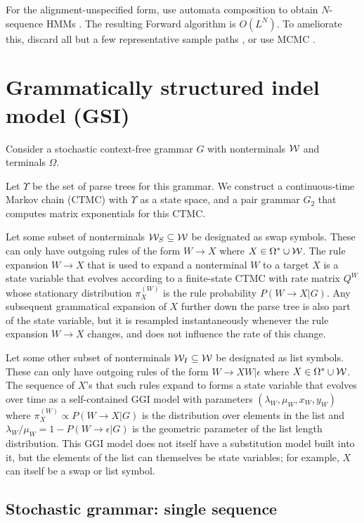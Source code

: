 \documentclass{article}
\begin{document}
For the alignment-unspecified form, use automata composition to obtain $N$-sequence HMMs \cite{SilvestreRyanEtAl2020}.
The resulting Forward algorithm is $O(L^N)$.
To ameliorate this, discard all but a few representative sample paths \cite{WestessonEtAl2012},
or use MCMC \cite{RedelingsSuchard2007}.


\section{Grammatically structured indel model (GSI)}

Consider a stochastic context-free grammar $G$
with nonterminals ${\cal W}$ and terminals $\Omega$.

Let $\Upsilon$ be the set of parse trees for this grammar.
We construct a continuous-time Markov chain (CTMC) with $\Upsilon$ as a state space,
and a pair grammar $G_2$ that computes matrix exponentials for this CTMC.

Let some subset of nonterminals ${\cal W}_S \subseteq {\cal W}$ be designated as swap symbols.
These can only have outgoing rules of the form $W \to X$ where $X \in \Omega^\ast \cup {\cal W}$.
The rule expansion $W \to X$ that is used to expand a nonterminal $W$ to a target $X$
is a state variable that evolves according to a finite-state CTMC with rate matrix $Q^W$
whose stationary distribution $\pi^{(W)}_X$ is the rule probability $P(W \to X|G)$.
Any subsequent grammatical expansion of $X$ further down the parse tree is also part of the state variable,
but it is resampled instantaneously whenever the rule expansion $W \to X$ changes,
and does not influence the rate of this change.

Let some other subset of nonterminals ${\cal W}_I \subseteq {\cal W}$ be designated as list symbols.
These can only have outgoing rules of the form $W \to X W | \epsilon$ where $X \in \Omega^\ast \cup {\cal W}$.
The sequence of $X$'s that such rules expand to forms a state variable
that evolves over time as a self-contained GGI model
with parameters $(\lambda_W, \mu_W, x_W, y_W)$
where $\pi^{(W)}_X \propto P(W \to X|G)$ is the distribution over elements in the list
and $\lambda_W / \mu_W = 1 - P(W \to \epsilon|G)$ is the geometric parameter of the list length distribution.
This GGI model does not itself have a substitution model built into it,
but the elements of the list can themselves be state variables;
for example, $X$ can itself be a swap or list symbol.

\subsection{Stochastic grammar: single sequence}
\end{document}
